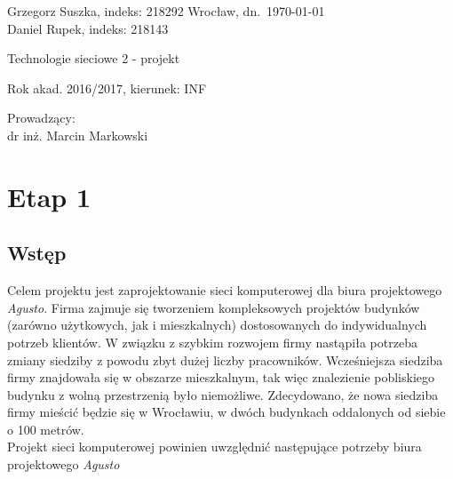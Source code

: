 \documentclass[a4paper, 12pt]{article}
\begin{document}
\thispagestyle{empty}
\noindent Grzegorz Suszka, indeks: 218292 \hfill Wrocław, dn.\ \today \\ Daniel Rupek, indeks: 218143 \\

\vfill

\begin{center}
  \begin{Huge}
  	Technologie sieciowe 2 - projekt \\
  \end{Huge}  
\end{center}

\begin{center}
  Rok akad. 2016/2017, kierunek: INF
\end{center}

\vspace{0.2ex}

\begin{flushright}
	\begin{minipage}[t]{0.4\columnwidth}
	\noindent Prowadzący:\\ dr inż. Marcin Markowski
	\end{minipage}
\end{flushright}

\vfill
\newpage
\tableofcontents
\listoftables
\vfill
\newpage

\section{Etap 1}

\subsection{Wstęp}

Celem projektu jest zaprojektowanie sieci komputerowej dla biura projektowego \emph{Agusto}. Firma zajmuje się tworzeniem kompleksowych projektów budynków (zarówno użytkowych, jak i mieszkalnych) dostosowanych do indywidualnych potrzeb klientów. W związku z szybkim rozwojem firmy nastąpiła potrzeba zmiany siedziby z powodu zbyt dużej liczby pracowników. Wcześniejsza siedziba firmy znajdowała się w obszarze mieszkalnym, tak więc znalezienie pobliskiego budynku z wolną przestrzenią było niemożliwe. Zdecydowano, że nowa siedziba firmy mieścić będzie się w Wrocławiu, w dwóch budynkach oddalonych od siebie o 100 metrów.\\

Projekt sieci komputerowej powinien uwzględnić następujące potrzeby biura projektowego \emph{Agusto}
\end{document}
